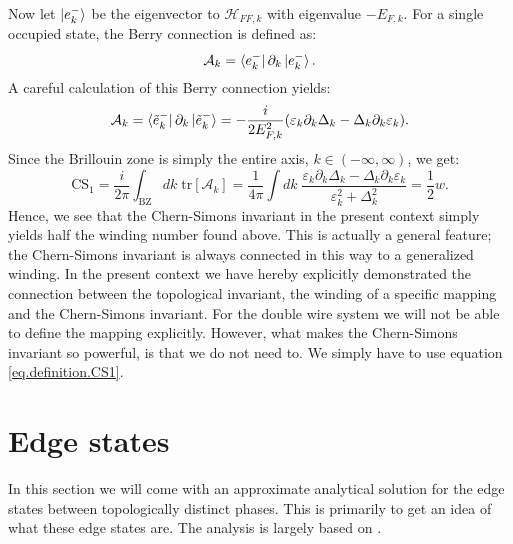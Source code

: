 Now let $\ket{e^{-}_k}$ be the eigenvector to $\mathcal{H}_{FF,k}$ with eigenvalue $-E_{F,k}$. For a single occupied state, the Berry connection is defined as:
\begin{equation}
\mathcal{A}_k = \bra{e^{-}_k}\partial_k\ket{e^{-}_k}. \nonumber
\end{equation}
A careful calculation of this Berry connection yields: 
\begin{equation}
\mathcal{A}_k = \bra{\tilde{e}^{-}_k}\partial_k\ket{\tilde{e}^{-}_k} = -\frac{i}{2E^2_{F,k}}(\varepsilon_k\partial_k\Delta_k - \Delta_k \partial_k \varepsilon_k). \nonumber 
\end{equation}
Since the Brillouin zone is simply the entire axis, $k\in (-\infty, \infty)$, we get:
\begin{equation}
\text{CS}_1 = \frac{i}{2\pi}\int_{\text{BZ}} dk\; \text{tr}\left[\mathcal{A}_k\right] = \frac{1}{4\pi}\int dk \;  \frac{\varepsilon_k\partial_k\Delta_k - \Delta_k \partial_k \varepsilon_k}{\varepsilon^2_k + \Delta^2_k} = \frac{1}{2}w. 
\label{eq.CSinv1}
\end{equation}
Hence, we see that the Chern-Simons invariant in the present context simply yields half the winding number found above. This is actually a general feature; the Chern-Simons invariant is always connected in this way to a generalized winding. In the present context we have hereby explicitly demonstrated the connection between the topological invariant, the winding of a specific mapping and the Chern-Simons invariant. For the double wire system we will not be able to define the mapping explicitly. However, what makes the Chern-Simons invariant so powerful, is that we do not need to. We simply have to use equation \eqref{eq.definition.CS1}.  

\section{Edge states}
\label{sec.edgestates}
In this section we will come with an approximate analytical solution for the edge states between topologically distinct phases. This is primarily to get an idea of what these edge states are. The analysis is largely based on \cite[pp. 196-198]{BernevigTITSC}. 

